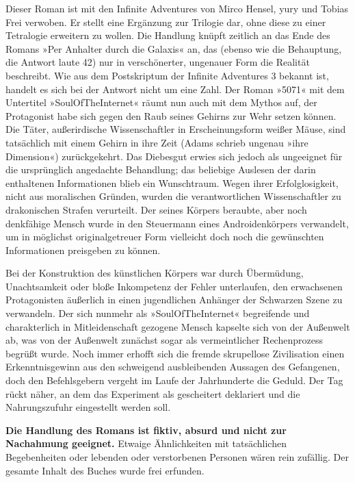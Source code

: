 Dieser Roman ist mit den Infinite Adventures von Mirco Hensel, yury und Tobias Frei verwoben. Er stellt eine Ergänzung zur Trilogie dar, ohne diese zu einer Tetralogie erweitern zu wollen. Die Handlung knüpft zeitlich an das Ende des Romans »Per Anhalter durch die Galaxis« an, das (ebenso wie die Behauptung, die Antwort laute 42) nur in verschönerter, ungenauer Form die Realität beschreibt. Wie aus dem Postskriptum der Infinite Adventures 3 bekannt ist, handelt es sich bei der Antwort nicht um eine Zahl. Der Roman »5071« mit dem Untertitel »SoulOfTheInternet« räumt nun auch mit dem Mythos auf, der Protagonist habe sich gegen den Raub seines Gehirns zur Wehr setzen können. Die Täter, außerirdische Wissenschaftler in Erscheinungsform weißer Mäuse, sind tatsächlich mit einem Gehirn in ihre Zeit (Adams schrieb ungenau »ihre Dimension«) zurückgekehrt. Das Diebesgut erwies sich jedoch als ungeeignet für die ursprünglich angedachte Behandlung; das beliebige Auslesen der darin enthaltenen Informationen blieb ein Wunschtraum. Wegen ihrer Erfolglosigkeit, nicht aus moralischen Gründen, wurden die verantwortlichen Wissenschaftler zu drakonischen Strafen verurteilt. Der seines Körpers beraubte, aber noch denkfähige Mensch wurde in den Steuermann eines Androidenkörpers verwandelt, um in möglichst originalgetreuer Form vielleicht doch noch die gewünschten Informationen preisgeben zu können.

Bei der Konstruktion des künstlichen Körpers war durch Übermüdung, Unachtsamkeit oder bloße Inkompetenz der Fehler unterlaufen, den erwachsenen Protagonisten äußerlich in einen jugendlichen Anhänger der Schwarzen Szene zu verwandeln. Der sich nunmehr als »SoulOfTheInternet« begreifende und charakterlich in Mitleidenschaft gezogene Mensch kapselte sich von der Außenwelt ab, was von der Außenwelt zunächst sogar als vermeintlicher Rechenprozess begrüßt wurde. Noch immer erhofft sich die fremde skrupellose Zivilisation einen Erkenntnisgewinn aus den schweigend ausbleibenden Aussagen des Gefangenen, doch den Befehlsgebern vergeht im Laufe der Jahrhunderte die Geduld. Der Tag rückt näher, an dem das Experiment als gescheitert deklariert und die Nahrungszufuhr eingestellt werden soll.

\bigskip

\noindent \textbf{Die Handlung des Romans ist fiktiv, absurd und nicht zur Nachahmung geeignet.} Etwaige Ähnlichkeiten mit tatsächlichen Begebenheiten oder lebenden oder verstorbenen Personen wären rein zufällig. Der gesamte Inhalt des Buches wurde frei erfunden.

